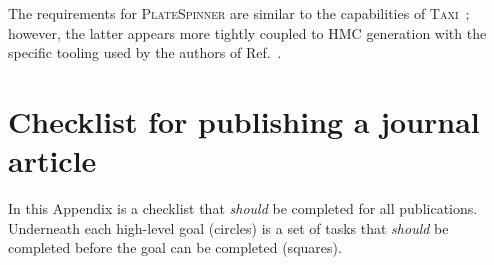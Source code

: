 \documentclass{article}
\newcommand\rfcword[1]{\emph{#1}\xspace}
\newcommand\should{\rfcword{should}}
\newcommand\program[1]{\textsc{#1}\xspace}
\begin{document}
The requirements for \program{PlateSpinner} are similar to the capabilities of \program{Taxi}~\cite{Ayyar:2018wwf};
however,
the latter appears more tightly coupled to HMC generation with
the specific tooling used by the authors of Ref.~\cite{Ayyar:2018wwf}.



\nocite{apsrev41Control}


\clearpage
\appendix

\section{Checklist for publishing a journal article}\label{app:checklist}

In this Appendix is a checklist that \should be completed for all publications.
Underneath each high-level goal
(circles)
is a set of tasks that \should be completed before the goal can be completed
(squares).
\end{document}
